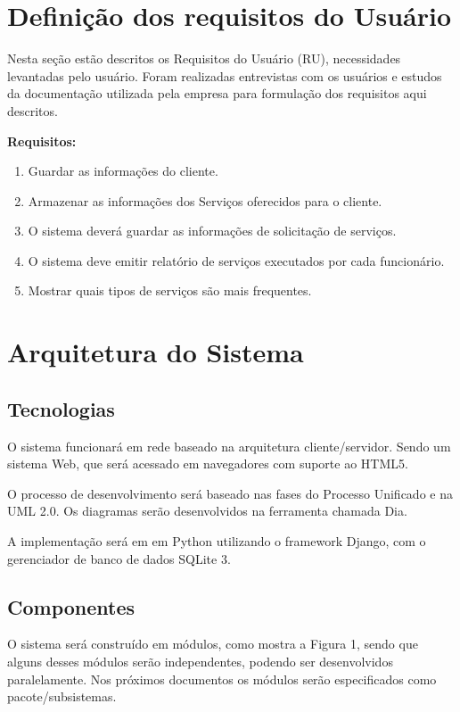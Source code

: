 \documentclass[
	12pt,				%
	openright,
	oneside,			%
	a4paper,			%
	chapter=TITLE,		%
	brazil				%
	]{abntex2}
\begin{document}
\chapter{Definição dos requisitos do Usuário}

Nesta seção estão descritos os Requisitos do Usuário (RU), necessidades levantadas pelo usuário. Foram realizadas entrevistas com os usuários e estudos da documentação utilizada pela empresa para formulação dos requisitos aqui descritos. 

\textbf{Requisitos:}

\begin{enumerate}[label=\bfseries RU\arabic*]
	\item Guardar as informações do cliente.
	\item Armazenar as informações dos Serviços oferecidos para o cliente.
	\item O sistema deverá guardar as informações de solicitação de serviços.
	\item O sistema deve emitir relatório de serviços executados por cada funcionário.
	\item Mostrar quais tipos de serviços são mais frequentes.
\end{enumerate}

\newpage
\chapter{Arquitetura do Sistema}

\section{Tecnologias}

O sistema funcionará em rede baseado na arquitetura cliente/servidor. Sendo um sistema Web, que será acessado em navegadores com suporte ao HTML5.  

O processo de desenvolvimento será baseado nas fases do Processo Unificado e na UML 2.0. Os diagramas serão desenvolvidos na ferramenta chamada Dia.


A implementação será em em Python utilizando o framework Django, com o gerenciador de banco de dados SQLite 3.

\section{Componentes}

O sistema será construído em módulos, como mostra a Figura 1, sendo que alguns desses módulos serão independentes, podendo ser desenvolvidos paralelamente. Nos próximos documentos os módulos serão especificados como pacote/subsistemas.
\end{document}
